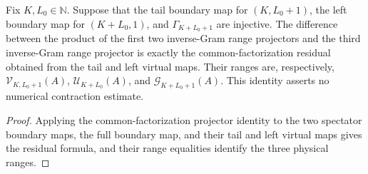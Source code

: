 \begin{lemma}%
    \label{thm:c3_spectator_projector_residual}
    \leanok
    Fix $K,L_0\in\mathbb N$.  Suppose that the tail boundary map for
    $(K,L_0+1)$, the left boundary map for $(K+L_0,1)$, and
    $\Gamma_{K+L_0+1}$ are injective.  The difference between the product of
    the first two inverse-Gram range projectors and the third inverse-Gram range
    projector is exactly the common-factorization residual obtained from the
    tail and left virtual maps.  Their ranges are, respectively,
    $\mathcal V_{K,L_0+1}(A)$, $\mathcal U_{K+L_0}(A)$, and
    $\mathcal G_{K+L_0+1}(A)$.  This identity asserts no numerical contraction
    estimate.
\end{lemma}
\begin{proof}
    \leanok
    Applying the common-factorization projector identity to the two spectator
    boundary maps, the full boundary map, and their tail and left virtual maps
    gives the residual formula, and their range equalities identify the three
    physical ranges.
\end{proof}

